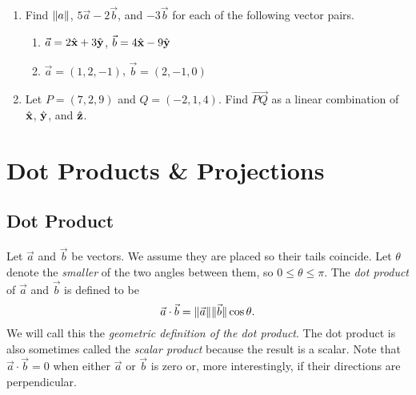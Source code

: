 \begin{exercises}
	\begin{enumerate}
		\item Find $\lVert a\rVert$, $5\vec a-2\vec b$, and $-3\vec b$ for each of
			the following vector pairs.
			\begin{enumerate}
				\item $\vec a=2{\hat {\mathbf x}}+3{\hat {\mathbf y}}$, $\vec b=4{\hat {\mathbf x}}-9{\hat {\mathbf y}}$
				\item $\vec a=(1,2,-1)$, $\vec b=(2,-1,0)$
			\end{enumerate}
		\item Let $P=(7,2,9)$ and $Q=(-2,1,4)$.  Find $\overrightarrow{PQ}$
			as a linear combination of ${\hat {\mathbf x}}$, ${\hat {\mathbf y}}$, and ${\hat {\mathbf z}}$.
	\end{enumerate}
\end{exercises}


\section{Dot Products \& Projections}
\subsection{Dot Product}
Let $\vec a$ and $\vec b$ be vectors.  We assume they are placed so their
tails coincide.  Let $\theta$ denote the \emph{smaller} of the
two angles between them, so $0\le \theta \le \pi$.
The \emph{dot product} of $\vec a$ and $\vec b$ is defined to be
\[
	\vec a\cdot \vec b=\lVert\vec a\rVert\lVert\vec b\rVert\cos \theta.
\]
We will call this the \emph{geometric definition of the dot product}.
The dot product is also sometimes called the \emph{scalar product} because
the result is a scalar.
Note that $\vec a\cdot\vec b = 0$ when either $\vec a$ or $\vec b$ is zero or,
more interestingly, if their directions are perpendicular.

